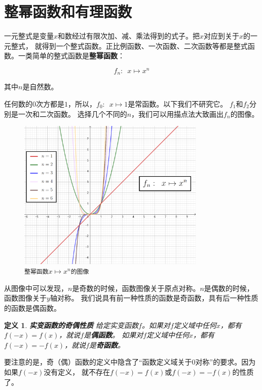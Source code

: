 \documentclass[12pt,UTF8]{ctexbook}
\newtheorem{df}{定义}[section]
\begin{document}
\section{整幂函数和有理函数}

一元整式是变量$x$和数经过有限次加、减、乘法得到的式子。把$x$对应到关于$x$的一元整式，
就得到一个整式函数。正比例函数、一次函数、二次函数等都是整式函数。一类简单的整式函数是\textbf{整幂函数}：

$$f_n: \,\,\, x \mapsto x^n$$

其中$n$是自然数。

任何数的$0$次方都是$1$，所以，$f_0:\,\,\, x\mapsto 1$是常函数。以下我们不研究它。
$f_1$和$f_2$分别是一次和二次函数。
选择几个不同的$n$，我们可以用描点法大致画出$f_n$的图像。

\begin{figure}[h]
    \vspace{4pt}
    \centering
    \includegraphics[width=0.8\textwidth]{整幂函数1.png}
    \caption*{\texttt{整幂函数}$x\mapsto x^n$\texttt{的图像}}
\end{figure}

从图像中可以发现，$n$是奇数的时候，函数图像关于原点对称。$n$是偶数的时候，函数图像关于$y$轴对称。
我们说具有前一种性质的函数是奇函数，具有后一种性质的函数是偶函数。
\begin{df}\textbf{实变函数的奇偶性质}
    给定实变函数$f$。如果对$f$定义域中任何$x$，都有$f(-x) = f(x)$，就说$f$是\textbf{偶函数}。
如果对$f$定义域中任何$x$，都有$f(-x) = -f(x)$，就说$f$是\textbf{奇函数}。
\end{df}

要注意的是，奇（偶）函数的定义中隐含了“函数定义域关于$0$对称”的要求。因为如果$f(-x)$没有定义，
就不存在$f(-x) = f(x)$或$f(-x) = -f(x)$的性质了。
\end{document}
